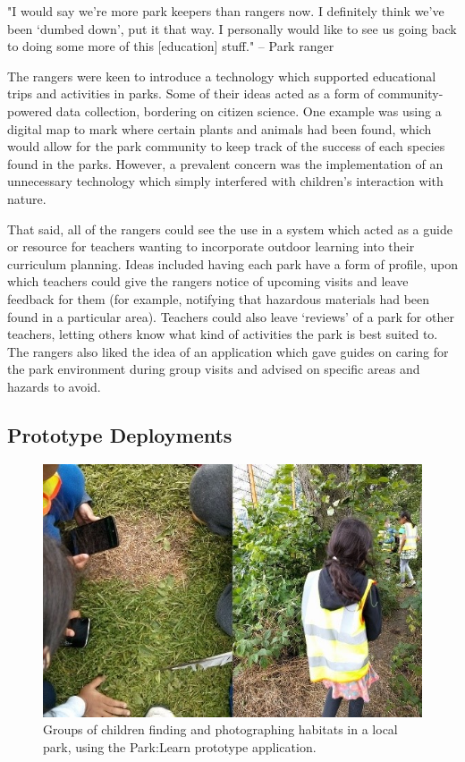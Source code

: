 \begin{displayquote}
"I would say we're more park keepers than rangers now. I definitely think we've been `dumbed down', put it that way. I personally would like to see us going back to doing some more of this [education] stuff." – Park ranger
\end{displayquote}

The rangers were keen to introduce a technology which supported educational trips and activities in parks. Some of their ideas acted as a form of community-powered data collection, bordering on citizen science. One example was using a digital map to mark where certain plants and animals had been found, which would allow for the park community to keep track of the success of each species found in the parks. However, a prevalent concern was the implementation of an unnecessary technology which simply interfered with children’s interaction with nature.

That said, all of the rangers could see the use in a system which acted as a guide or resource for teachers wanting to incorporate outdoor learning into their curriculum planning. Ideas included having each park have a form of profile, upon which teachers could give the rangers notice of upcoming visits and leave feedback for them (for example, notifying that hazardous materials had been found in a particular area). Teachers could also leave `reviews' of a park for other teachers, letting others know what kind of activities the park is best suited to. The rangers also liked the idea of an application which gave guides on caring for the park environment during group visits and advised on specific areas and hazards to avoid.


\subsection{Prototype Deployments}

\begin{figure}
  \centering
  \includegraphics[width=0.8\columnwidth]{images/chapter04/prototypeDeployment.jpg}
  \caption[Children during the Park:Learn summer school deployment]{Groups of children finding and photographing habitats in a local park, using the Park:Learn prototype application.}
  \label{fig:prototypeDeployment}
\end{figure}


